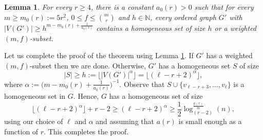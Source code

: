 \documentclass[11pt]{article}
\let\oldendproof\endproof
\renewenvironment{proof}[1][\proofname]{%
	\oldproof[\bf #1]%
}{\oldendproof}
\theoremstyle{plain}
\newtheorem{lemma}[theorem]{Lemma}
\begin{document}
\begin{proof}[Proof of Theorem \ref{main-result-1}]
    \begin{lemma} \label{r-graphs induction}
    For every $r \geq 4$, there is a constant $a_0(r)>0$ such that for every $m \geq m_0(r) := 5 r^2$, $0 \leq f \leq \binom{m}{r}$ and $h \in \mathbb{N}$, every ordered graph $G'$ with $|V(G')| \geq h^{m - m_0(r) + \frac{1}{a_0(r)}}$ contains a homogeneous set of size $h$ or a weighted $(m,f)$-subset.
    \end{lemma}
    
    Let us complete the proof of the theorem using Lemma \ref{r-graphs induction}.
    If $G'$ has a weighted $(m,f)$-subset then we are done. Otherwise, $G'$ has a homogeneous set $S$ of size 
    $$
    |S| \geq h := \lfloor |V(G')|^{\alpha} \rfloor = \lfloor (\ell-r+2)^\alpha \rfloor,
    $$
    where 
    $\alpha := \big(m - m_0(r) + \frac{1}{a_0(r)}\big)^{-1}$. Observe that $S \cup \{v_{\ell-r+3},\dots,v_{\ell}\}$ is a homogeneous set in $G$. Hence, $G$ has a homogeneous set of size
    $$
    \lfloor (\ell-r+2)^\alpha \rfloor + r-2 \geq
    (\ell-r+2)^\alpha \geq 
    \frac{1}{2} \log_{(r-2)}^{\frac{a(r)}{m}}(n),
    $$
    using our choice of $\ell$ and $\alpha$ and assuming that $a(r)$ is small enough as a function of $r$.
    This completes the proof. 
\end{proof}
\end{document}
